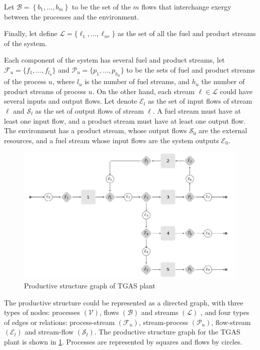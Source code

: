 \documentclass{ecos2018}
\begin{document}
Let $\mathcal{B}=\left\{b_1,\ldots,b_m\right\}$ to be the set of the $m$ flows that interchange exergy between the processes and the environment.

Finally, let define $\mathcal{L}=\{\ell_1,\ldots,\ell_{nr}\}$ as the set of all the fuel and product streams of the system.

Each component of the system has several fuel and product streams, let  ${\mathcal{F}_u=\{f_1,\ldots,f_{l_u}\}}$ and ${\mathcal{P}_u=\{p_1,\ldots,p_{h_u}\}}$ to be the sets of fuel and product streams of the process $u$, where $l_u$ is the number of fuel streams, and $h_u$ the number of product streams of process $u$.
On the other hand, each stream $\ell \in \mathcal{L}$ could have several inputs and output flows. Let denote $\mathcal{E}_l$ as the set of input flows of stream $\ell$ and $\mathcal{S}_l$ as the set of output flows of stream $\ell$.  A fuel stream must have at least one input flow, and a product stream must have at least one output flow. The environment has a product stream, whose output flows $\mathcal{S}_0$ are the external resources, and a fuel stream whose input flows are the system outputs $\mathcal{E}_0$.

\begin{figure}[htpb]
	\centering
	\includegraphics[width=0.95\linewidth]{tgasfp1}
	\caption{Productive structure graph of TGAS plant}
	\label{tgasfp}
\end{figure}

The productive structure could be represented as a directed graph, with three types of nodes: processes $(\mathcal{V})$, flows $(\mathcal{B})$ and streams $(\mathcal{L})$ , and four types of edges or relations: process-stream  $(\mathcal{F}_u)$, stream-process $(\mathcal{P}_u)$, flow-stream $(\mathcal{E}_l)$ and stream-flow $(\mathcal{S}_l)$. The productive structure graph for the TGAS plant is shown in \cref{tgasfp}. Processes are represented by squares and flows by circles.
\end{document}
